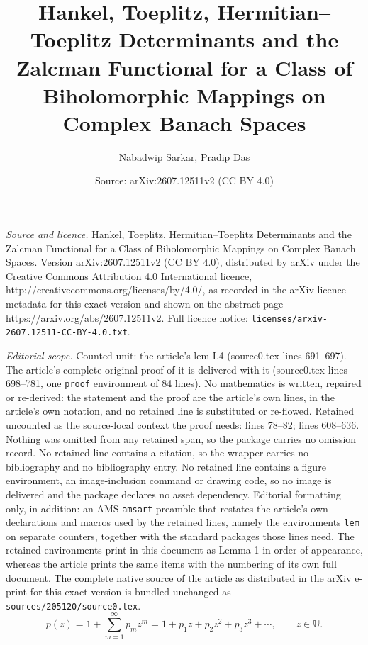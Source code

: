 \documentclass[10pt,a4paper]{amsart}
\title{Hankel, Toeplitz, Hermitian--Toeplitz Determinants and the Zalcman Functional for a Class of Biholomorphic Mappings on Complex Banach Spaces}
\author{Nabadwip Sarkar, Pradip Das}
\date{Source: arXiv:2607.12511v2 (CC BY 4.0)}
\begin{document}
\maketitle

\noindent\emph{Source and licence.} Hankel, Toeplitz, Hermitian--Toeplitz Determinants and the Zalcman Functional for a Class of Biholomorphic Mappings on Complex Banach Spaces. Version arXiv:2607.12511v2 (CC BY 4.0), distributed by arXiv under the Creative Commons Attribution 4.0 International licence, http://creativecommons.org/licenses/by/4.0/, as recorded in the arXiv licence metadata for this exact version and shown on the abstract page https://arxiv.org/abs/2607.12511v2. Full licence notice: \texttt{licenses/arxiv-2607.12511-CC-BY-4.0.txt}.\par\smallskip

\noindent\textit{Editorial scope.} Counted unit: the article's lem L4 (source0.tex lines 691--697). The article's complete original proof of it is delivered with it (source0.tex lines 698--781, one \texttt{proof} environment of 84 lines). No mathematics is written, repaired or re-derived: the statement and the proof are the article's own lines, in the article's own notation, and no retained line is substituted or re-flowed.  Retained uncounted as the source-local context the proof needs: lines 78--82; lines 608--636.  Nothing was omitted from any retained span, so the package carries no omission record.  No retained line contains a citation, so the wrapper carries no bibliography and no bibliography entry.  No retained line contains a figure environment, an image-inclusion command or drawing code, so no image is delivered and the package declares no asset dependency.  Editorial formatting only, in addition: an AMS \texttt{amsart} preamble that restates the article's own declarations and macros used by the retained lines, namely the environments \texttt{lem} on separate counters, together with the standard packages those lines need.  The retained environments print in this document as Lemma 1 in order of appearance, whereas the article prints the same items with the numbering of its own full document.  The complete native source of the article as distributed in the arXiv e-print for this exact version is bundled unchanged as \texttt{sources/205120/source0.tex}.
\begin{equation}\label{eq:P}
p(z)=1+\sum_{m=1}^{\infty}p_mz^m
=1+p_1z+p_2z^2+p_3z^3+\cdots,
\qquad z\in\mathbb{U}.
\end{equation}
\end{document}
